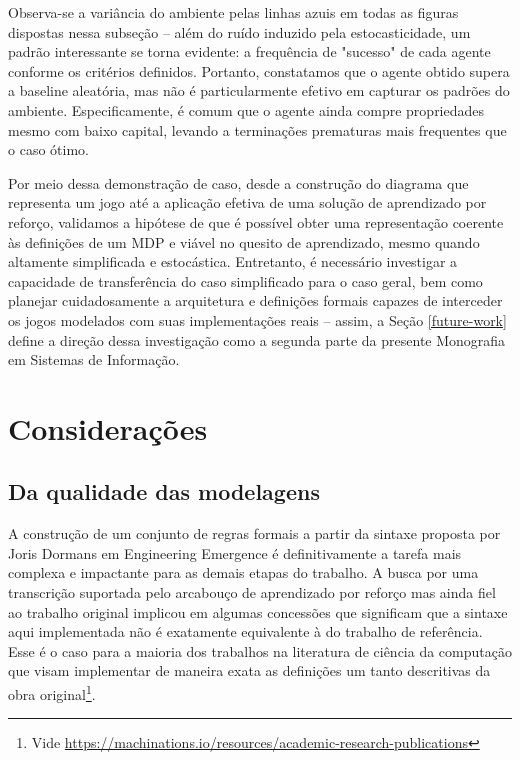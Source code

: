 \documentclass[conference]{IEEEtran}
\begin{document}
Observa-se a variância do ambiente pelas linhas azuis em todas as figuras dispostas nessa subseção -- além do ruído induzido pela estocasticidade, um padrão interessante se torna evidente: a frequência de "sucesso" de cada agente conforme os critérios definidos. Portanto, constatamos que o agente obtido supera a baseline aleatória, mas não é particularmente efetivo em capturar os padrões do ambiente. Especificamente, é comum que o agente ainda compre propriedades mesmo com baixo capital, levando a terminações prematuras mais frequentes que o caso ótimo.

Por meio dessa demonstração de caso, desde a construção do diagrama que representa um jogo até a aplicação efetiva de uma solução de aprendizado por reforço, validamos a hipótese de que é possível obter uma representação coerente às definições de um MDP e viável no quesito de aprendizado, mesmo quando altamente simplificada e estocástica. Entretanto, é necessário investigar a capacidade de transferência do caso simplificado para o caso geral, bem como planejar cuidadosamente a arquitetura e definições formais capazes de interceder os jogos modelados com suas implementações reais -- assim, a Seção \ref{future-work} define a direção dessa investigação como a segunda parte da presente Monografia em Sistemas de Informação.

\section{Considerações}

\subsection{Da qualidade das modelagens}
A construção de um conjunto de regras formais a partir da sintaxe proposta por Joris Dormans em Engineering Emergence é definitivamente a tarefa mais complexa e impactante para as demais etapas do trabalho. A busca por uma transcrição suportada pelo arcabouço de aprendizado por reforço mas ainda fiel ao trabalho original implicou em algumas concessões que significam que a sintaxe aqui implementada não é exatamente equivalente à do trabalho de referência. Esse é o caso para a maioria dos trabalhos na literatura de ciência da computação que visam implementar de maneira exata as definições um tanto descritivas da obra original\footnote{Vide \url{https://machinations.io/resources/academic-research-publications}}.
\end{document}
